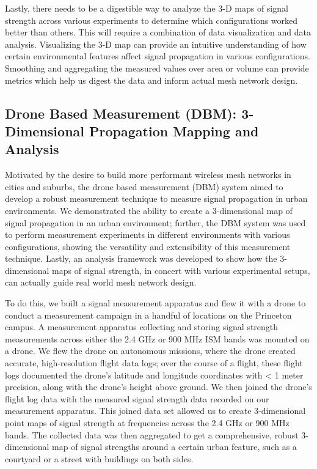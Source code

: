 \documentclass[pageno]{jpaper}
\begin{document}
Lastly, there needs to be a digestible way to analyze the 3-D maps of signal strength across various experiments to determine which configurations worked better than others. This will require a combination of data visualization and data analysis. Visualizing the 3-D map can provide an intuitive understanding of how certain environmental features affect signal propagation in various configurations. Smoothing and aggregating the measured values over area or volume can provide metrics which help us digest the data and inform actual mesh network design.

\subsection{Drone Based Measurement (DBM): 3-Dimensional Propagation Mapping and Analysis}

Motivated by the desire to build more performant wireless mesh networks  in cities and suburbs, the drone based measurement (DBM) system aimed to develop a robust measurement technique to measure signal propagation in urban environments. We demonstrated the ability to create a 3-dimensional map of signal propagation in an urban environment; further, the DBM system was used to perform measurement experiments in different environments with various configurations, showing the versatility and extensibility of this measurement technique. Lastly, an analysis framework was developed to show how the 3-dimensional maps of signal strength, in concert with various experimental setups, can actually guide real world mesh network design. 

To do this, we built a signal measurement apparatus and flew it with a drone to conduct a measurement campaign in a handful of locations on the Princeton campus. A measurement apparatus collecting and storing signal strength measurements across either the 2.4 GHz or 900 MHz ISM bands was  mounted on a drone. We flew the drone on autonomous missions, where the drone created accurate, high-resolution flight data logs; over the course of a flight, these flight logs documented the drone's latitude and longitude coordinates with < 1 meter precision, along with the drone's height above ground. We then joined the drone's flight log data with the measured signal strength data recorded on our measurement apparatus. This joined data set allowed us to create 3-dimensional point maps of signal strength at frequencies across the 2.4 GHz or 900 MHz bands. The collected data was then aggregated to get a comprehensive, robust 3-dimensional map of signal strengths around a certain urban feature, such as a courtyard or a street with buildings on both sides.
\end{document}
